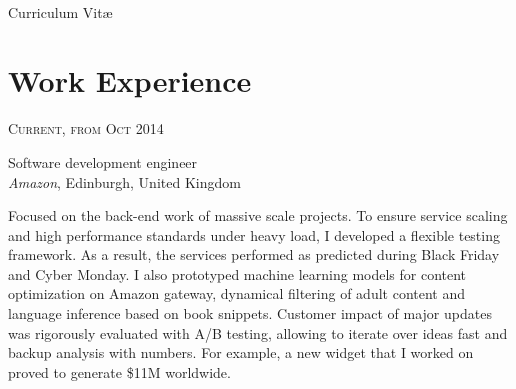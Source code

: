 \documentclass[10pt]{article} %
\begin{document}
\color{text1} %


\par{\\ %
{\color{headings} Curriculum {Vit\ae}\\[15pt]\par} %
	

\begin{minipage}[t]{0.5\textwidth} %
\vspace{0pt} %
	

\section{Work Experience} 


{\raggedleft\textsc{Current, from Oct 2014}\par}

{\raggedright\large Software development engineer\\
\textit{Amazon}, Edinburgh, United Kingdom\\[5pt]}

\normalsize{Focused on the back-end work of massive scale projects. To ensure service scaling and high performance standards under heavy load, I developed a flexible testing framework. As a result, the services performed as predicted during Black Friday and Cyber Monday. I also prototyped machine learning models for content optimization on Amazon gateway, dynamical filtering of adult content and language inference based on book snippets. Customer impact of major updates was rigorously evaluated with A/B testing, allowing to iterate over ideas fast and backup analysis with numbers. For example, a new widget that I worked on proved to generate \$11M worldwide.}\\


\end{minipage}}
\end{document}
